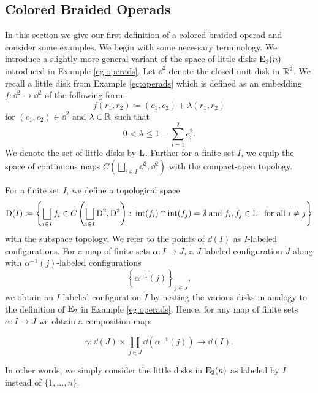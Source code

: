 \subsection{Colored Braided Operads}

In this section we give our first definition of a colored braided operad and
consider some examples. We begin with some necessary terminology. We introduce a
slightly more general variant of the space of little disks $\operatorname{E}_2(n)$ introduced
in Example \ref{eg:operads}. Let $\dd^2$ denote the closed unit disk in $\mathbb{R}^2$.
We recall a little disk from Example \ref{eg:operads} which is defined as an
embedding $f \colon \dd^2 \to \dd^2$ of the following form:
\[
    f(r_1, r_2) \coloneqq (c_1, c_2) + \lambda(r_1, r_2)
\]
for $(c_1, c_2) \in \dd^2$ and $\lambda \in \mathbb{R}$ such that
\[
    0 < \lambda \leq 1 - \sum_{i=1}^{2} c_i^2.     
\]
We denote the set of little disks by $\operatorname{L}$. Further for a finite set $I$, we
equip the space of continuous maps $C\left(\bigsqcup_{i \in I} \dd^2,
\dd^2\right)$ with the compact-open topology.

\begin{defin}\label{def:ilabeled} For a finite set $I$, we define a topological
space
\[
    \operatorname{D}(I) \coloneqq \left\{ \bigsqcup_{i \in I} f_i \in C\left(\bigsqcup_{i \in I} \operatorname{D}^2, \operatorname{D}^2\right) \colon \operatorname{int}(f_i) \cap \operatorname{int}(f_j) = \emptyset  \; \text{and} \; f_i, f_j \in \operatorname{L} \; \text{ for all } i \not= j\right\}
\]
with the subspace topology. We refer to the points of $\dd(I)$ as $I$-labeled
configurations. 
For a map of finite sets $\alpha \colon I \to J$, a $J$-labeled configuration
$\widetilde{J}$ along with $\alpha^{-1}(j)$-labeled configurations 
$$\left\{\widetilde{\alpha^{-1}(j)}\right\}_{j \in J},$$ we obtain an
$I$-labeled configuration $\widetilde{I}$ by nesting the various disks in
analogy to the definition of $\operatorname{E}_2$ in Example \ref{eg:operads}. Hence, for any
map of finite sets $\alpha \colon I \to J$ we obtain a composition map:

\begin{equation}\label{eq:defcomp}
    \gamma: \dd(J) \times \prod_{j \in J} \dd(\alpha^{-1}(j)) \to \dd(I).
\end{equation}
\end{defin}

In other words, we simply consider the little disks in $\operatorname{E}_2(n)$ as labeled by
$I$ instead of $\{1,...,n\}$. 

